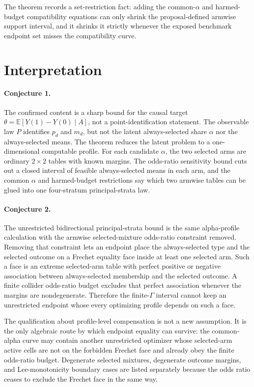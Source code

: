 \documentclass[11pt]{article}
\newcommand{\E}{\mathbb{E}}
\theoremstyle{definition}
\theoremstyle{plain}
\theoremstyle{remark}
\begin{document}
The theorem records a set-restriction fact: adding the common-\(\alpha\) and
harmed-budget compatibility equations can only shrink the proposal-defined
armwise support interval, and it shrinks it strictly whenever the exposed
benchmark endpoint set misses the compatibility curve.

\section{Interpretation}
\paragraph{Conjecture 1.}
The confirmed content is a sharp bound for the causal target
\(\theta=\E[Y(1)-Y(0)\mid A]\), not a point-identification statement.  The
observable law \(P\) identifies \(p_d\) and \(m_d\), but not the latent
always-selected share \(\alpha\) nor the always-selected means.  The theorem
reduces the latent problem to a one-dimensional computable profile.  For each
candidate \(\alpha\), the two selected arms are ordinary \(2\times2\) tables
with known margins.  The odds-ratio sensitivity bound cuts out a closed
interval of feasible always-selected means in each arm, and the common
\(\alpha\) and harmed-budget restrictions say which two armwise tables can be
glued into one four-stratum principal-strata law.

\paragraph{Conjecture 2.}
The unrestricted bidirectional principal-strata bound is the same alpha-profile
calculation with the armwise selected-mixture odds-ratio constraint removed.
Removing that constraint lets an endpoint place the always-selected type and
the selected outcome on a Frechet equality face inside at least one selected
arm.  Such a face is an extreme selected-arm table with perfect positive or
negative association between always-selected membership and the selected
outcome.  A finite collider odds-ratio budget excludes that perfect association
whenever the margins are nondegenerate.  Therefore the finite-\(\Gamma\)
interval cannot keep an unrestricted endpoint whose every optimizing profile
depends on such a face.

The qualification about profile-level compensation is not a new assumption.  It
is the only algebraic route by which endpoint equality can survive: the
common-alpha curve may contain another unrestricted optimizer whose
selected-arm active cells are not on the forbidden Frechet face and already
obey the finite odds-ratio budget.  Degenerate selected mixtures, degenerate
outcome margins, and Lee-monotonicity boundary cases are listed separately
because the odds ratio ceases to exclude the Frechet face in the same way.
\end{document}
